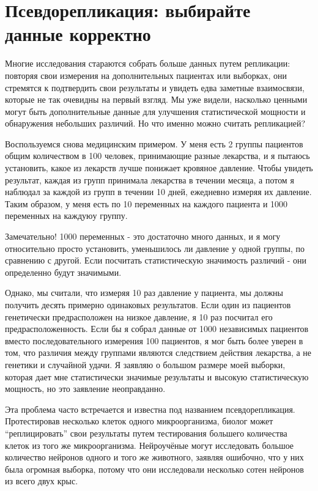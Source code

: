 \chapter{Псевдорепликация: выбирайте данные корректно}
\label{chp4}

Многие исследования стараются собрать больше данных путем репликации: повторяя свои измерения на дополнительных пациентах или выборках, они стремятся к подтвердить свои результаты и увидеть едва заметные взаимосвязи, которые не так очевидны на первый взгляд. Мы уже видели, насколько ценными могут быть дополнительные данные для улучшения статистической мощности и обнаружения небольших различий. Но что именно можно считать репликацией?

Воспользуемся снова медицинским примером. У меня есть 2 группы пациентов общим количеством в 100 человек, принимающие разные лекарства, и я пытаюсь установить, какое из лекарств лучше понижает кровяное давление. Чтобы увидеть результат, каждая из групп принимала лекарства в течении месяца, а потом я наблюдал за каждой из групп в течении 10 дней, ежедневно измеряя их давление. Таким образом, у меня есть по 10 переменных на каждого пациента и 1000 переменных на каждуюу группу. 

Замечательно! 1000 переменных - это достаточно много данных, и я могу относительно просто установить, уменьшилось ли давление у одной группы, по сравнению с другой. Если посчитать статистическую значимость различий - они определенно будут значимыми.

Однако, мы считали, что измеряя 10 раз давление у пациента, мы должны получить десять примерно одинаковых результатов. Если один из пациентов генетически предрасположен на низкое давление, я 10 раз посчитал его предрасположенность. Если бы я собрал данные от 1000 независимых пациентов вместо последовательного измерения 100 пациентов, я мог быть более уверен в том, что различия между группами являются следствием действия лекарства, а не генетики и случайной удачи. Я заявляю о большом размере моей выборки, которая дает мне статистически значимые результаты и высокую статистическую мощность, но это заявление неоправданно.  

Эта проблема часто встречается и известна под названием псевдорепликация.\cite{lazic_problem_2010} Протестировав несколько клеток одного микроорганизма, биолог может ``реплицировать'' свои результаты путем тестирования большего количества клеток из того же микроорганизма. Нейроучёные могут исследовать большое количество нейронов одного и того же животного, заявляя ошибочно, что у них была огромная выборка, потому что они исследовали несколько сотен нейронов из всего двух крыс.

